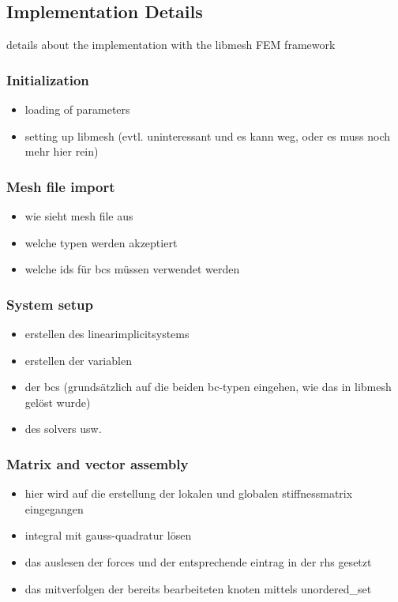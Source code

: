  \subsection{Implementation Details}
 details about the implementation with the libmesh FEM framework %
 
 
 
  \subsubsection{Initialization}
   \begin{itemize}
   	\item loading of parameters
   	\item setting up libmesh (evtl. uninteressant und es kann weg, oder es muss noch mehr hier rein)
   \end{itemize}
   
   
   
  \subsubsection{Mesh file import}
   \begin{itemize}
   	\item wie sieht mesh file aus
   	\item welche typen werden akzeptiert
   	\item welche ids für bcs müssen verwendet werden
   \end{itemize}
   
   
   
  \subsubsection{System setup}
   \begin{itemize}
   	\item erstellen des linearimplicitsystems
   	\item erstellen der variablen
   	\item der bcs (grundsätzlich auf die beiden bc-typen eingehen, wie das in libmesh gelöst wurde)
   	\item des solvers usw.
   \end{itemize}
   
   
   
  \subsubsection{Matrix and vector assembly}
   \begin{itemize}
   	\item hier wird auf die erstellung der lokalen und globalen stiffnessmatrix eingegangen
   	\item integral mit gauss-quadratur lösen
   	\item das auslesen der forces und der entsprechende eintrag in der rhs gesetzt
   	\item das mitverfolgen der bereits bearbeiteten knoten mittels unordered\_set
   \end{itemize}
   
